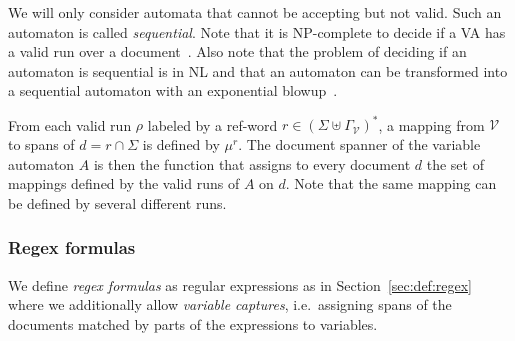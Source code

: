 \documentclass[12px]{article}
\theoremstyle{definition}
\begin{document}

        We will only consider automata that cannot be accepting but not valid.
        Such an automaton is called \textit{sequential}. Note that it is
        NP-complete to decide if a VA has a valid run over a
        document~\cite{freydenberger:LIPIcs:2017}. Also note that the problem
        of deciding if an automaton is sequential is in NL and that an
        automaton can be transformed into a sequential automaton with an
        exponential blowup~\cite{ICDT19}.

        From each valid run $\rho$ labeled by a ref-word $r \in {(\Sigma \uplus
        \Gamma_\mathcal{V})}^*$, a mapping from $\mathcal{V}$ to spans of $d =
        r \cap \Sigma$ is defined by $\mu^r$. The document spanner of the
        variable automaton $A$ is then the function that assigns to every
        document $d$ the set of mappings defined by the valid runs of $A$ on
        $d$. Note that the same mapping can be defined by several different
        runs.


      \subsubsection{Regex formulas}%
        \label{sec:regex_formula}

        We define \emph{regex formulas} as regular expressions as in
        Section~\ref{sec:def:regex} where we additionally allow \emph{variable
        captures}, i.e.\ assigning spans of the documents matched by parts of
        the expressions to variables.
\end{document}
